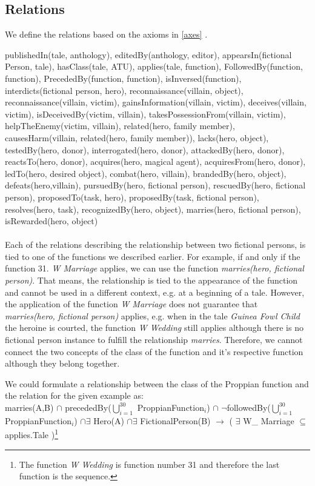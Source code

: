 \documentclass[10pt,a4paper]{article}
\begin{document}
\subsection{Relations}
We define the relations based on the axioms in \ref{axes} . 

publishedIn(tale, anthology), editedBy(anthology, editor), appearsIn(fictional Person, tale), hasClass(tale, ATU), applies(tale, function), FollowedBy(function, function), PrecededBy(function, function), isInversed(function), interdicts(fictional person, hero), reconnaissance(villain, object), reconnaissance(villain, victim), gainsInformation(villain, victim), deceives(villain, victim), isDeceivedBy(victim, villain), takesPossessionFrom(villain, victim), helpTheEnemy(victim, villain), related(hero, family member), causesHarm(villain, related(hero, family member)), lacks(hero, object), testedBy(hero, donor), interrogated(hero, donor), attackedBy(hero, donor), reactsTo(hero, donor), acquires(hero, magical agent), acquiresFrom(hero, donor), ledTo(hero, desired object), combat(hero, villain), brandedBy(hero, object), defeats(hero,villain), pursuedBy(hero, fictional person), rescuedBy(hero, fictional person), proposedTo(task, hero), proposedBy(task, fictional person), resolves(hero, task), recognizedBy(hero, object), marries(hero, fictional person), isRewarded(hero, object)
\\ \\
Each of the relations describing the relationship between two fictional persons, is tied to one of the functions we described earlier. For example, if and only if the function 31. \textit{W Marriage} applies, we can use the function \textit{marries(hero, fictional person)}. That means, the relationship is tied to the appearance of the function and cannot be used in a different context, e.g. at a beginning of a tale. 
However, the application of the function \textit{W Marriage} does not guarantee that \textit{marries(hero, fictional person)} applies, e.g. when in the tale \textit{Guinea Fowl Child} the heroine is courted, the function \textit{W Wedding} still applies although there is no fictional person instance to fulfill the relationship \textit{marries}. Therefore, we cannot connect the two concepts of the class of the function and it's respective function although they belong together.   


We could formulate a relationship between the class of the Proppian function and the relation for the given example as: \\
\label{Rel}
\small
marries(A,B) $\cap$ precededBy($\bigcup\limits_{i=1}^{30}$ ProppianFunction$_{i}$)  $\cap$ $\neg$followedBy($\bigcup\limits_{i=1}^{30}$ ProppianFunction$_{i}$)
$\cap \exists $ Hero(A) $\cap \exists$ FictionalPerson(B) $\rightarrow$ ( $\exists$ W\_ Marriage $\subseteq$ applies.Tale )\footnote{The function \textit{W Wedding} is function number 31 and therefore the last function is the sequence.} \\
\end{document}

